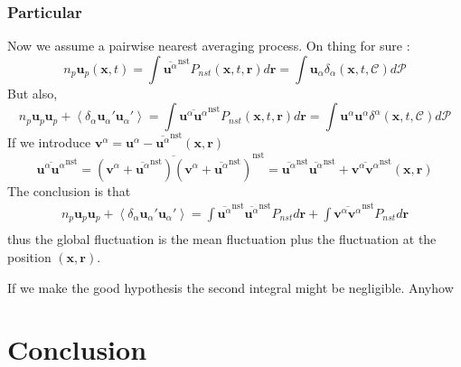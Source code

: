 \documentclass[12pt]{My_preprint}
\newcommand{\avg}[1]{\left<#1\right>}
\renewcommand{\avg}[1]{\left<#1\right>}
\newcommand{\pavg}[1]{\avg{\delta_\alpha #1}}
\newcommand{\nstavg}[1]{\overline{#1}^\text{nst}}
\newcommand{\CC}{\mathscr{C}}
\newcommand{\PP}{\mathscr{P}}
\begin{document}
\subsubsection*{Particular}
Now we assume a pairwise nearest averaging process. 
On thing for sure : 
\begin{equation*}
    n_p \textbf{u}_p(\textbf{x},t)
    = \int \nstavg{ \textbf{u}^\alpha}  P_{nst}(\textbf{x},t,\textbf{r}) d\textbf{r}
    = \int  \textbf{u}_\alpha \delta_\alpha (\textbf{x},t,\CC) d\PP 
\end{equation*}
But also, 
\begin{equation*}
    n_p \textbf{u}_p \textbf{u}_p
    + \pavg{\textbf{u}_\alpha' \textbf{u}_\alpha'}
    =
    \int \nstavg{ \textbf{u}^\alpha\textbf{u}^\alpha}  P_{nst}(\textbf{x},t,\textbf{r}) d\textbf{r}
    = \int  \textbf{u}^\alpha\textbf{u}^\alpha \delta^\alpha (\textbf{x},t,\CC) d\PP 
\end{equation*}
If we introduce $\textbf{v}^\alpha = \textbf{u}^\alpha - \nstavg{\textbf{u}^\alpha}(\textbf{x},\textbf{r})$ 
\begin{equation*}
    \nstavg{ \textbf{u}^\alpha\textbf{u}^\alpha}
    = \nstavg{ (\textbf{v}^\alpha + \nstavg{\textbf{u}^\alpha})(\textbf{v}^\alpha + \nstavg{\textbf{u}^\alpha})}
    = \nstavg{ \textbf{u}^\alpha}\nstavg{\textbf{u}^\alpha} + \nstavg{ \textbf{v}^\alpha \textbf{v}^\alpha }(\textbf{x},\textbf{r})
\end{equation*}
The conclusion is that 
\begin{align*}
    n_p \textbf{u}_p \textbf{u}_p
    + \pavg{\textbf{u}_\alpha' \textbf{u}_\alpha'}
    =\int \nstavg{ \textbf{u}^\alpha}\nstavg{\textbf{u}^\alpha} P_{nst} d\textbf{r}
    + \int \nstavg{ \textbf{v}^\alpha \textbf{v}^\alpha }  P_{nst} d\textbf{r}\\
\end{align*}
thus the global fluctuation is the mean fluctuation plus the fluctuation at the position $(\textbf{x},\textbf{r})$. 

If we make the  good hypothesis the second integral might be negligible. 
Anyhow 

\section{Conclusion}




\appendix
\end{document}

